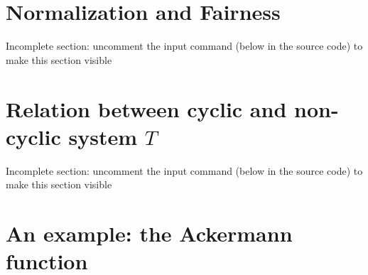 \documentclass{article}
\begin{document}
\section{Normalization and Fairness}
\label{section-normalization-fairness}
{Incomplete section: uncomment the input command (below in the source code) to make this section visible}
%


\section{Relation between cyclic and non-cyclic system $T$} 
\label{section-equivalence-cyclic-non-cyclic-T}
{Incomplete section: uncomment the input command (below in the source code) to make this section visible}
%

\section{An example: the Ackermann function} 
\label{section-ackermann}


%
%
%
%
%
%
%
%
%
\end{document}
